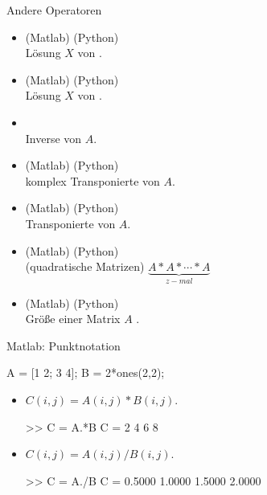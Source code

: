 \documentclass[hyperref={xetex}]{beamer}
\begin{document}
\begin{frame}[fragile]{Andere Operatoren}
\begin{itemize}
\item {}(Matlab) (Python)\\ Lösung $X$ von . \\

\item {}(Matlab) (Python)\\ Lösung $X$ von .\\

\item {}\\ Inverse von $A$.\\

\item {}(Matlab) (Python)\\ komplex Transponierte von $A$. \\

\item {}(Matlab) (Python)\\ Transponierte von $A$. \\

\item {}(Matlab) (Python)\\ (quadratische Matrizen) $\underbrace{A*A*\cdots *A}_{z-mal}$ \\

\item {}(Matlab) (Python)\\ Gr\"o{\ss}e einer Matrix $A$ . 
\end{itemize}
\end{frame}
%
%
\begin{frame}[fragile]{Matlab: Punktnotation}
\begin{matlabin}
A = [1 2; 3 4]; B = 2*ones(2,2);
\end{matlabin}
\begin{itemize}
\item $C(i,j)=A(i,j)*B(i,j)$.
\begin{matlabin}
>> C = A.*B
C =
     2     4
     6     8
\end{matlabin}
\item $C(i,j)=A(i,j)/B(i,j)$.
\begin{matlabin}
>> C = A./B
C =
    0.5000    1.0000
    1.5000    2.0000
\end{matlabin}
\end{itemize}
\end{frame}
\end{document}
